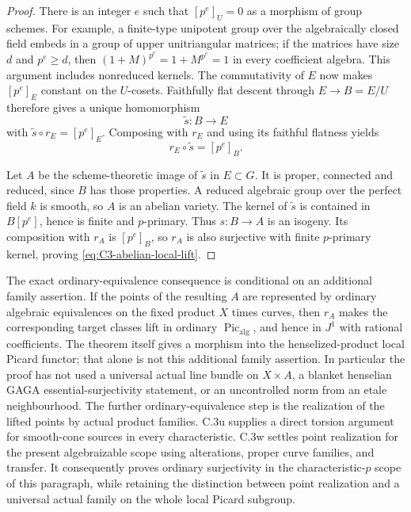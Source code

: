 \begin{proof}
There is an integer $e$ such that
$[p^e]_U=0$ as a morphism of group schemes.
For example, a finite-type unipotent group
over the algebraically closed field embeds
in a group of upper unitriangular matrices;
if the matrices have size $d$ and $p^e\ge d$,
then $(1+M)^{p^e}=1+M^{p^e}=1$ in every
coefficient algebra. This argument includes
nonreduced kernels. The commutativity of $E$
now makes $[p^e]_E$ constant on the $U$-cosets.
Faithfully flat descent through $E\to B=E/U$
therefore gives a unique homomorphism
\[
                         \widetilde s:B\longrightarrow E
\]
with $\widetilde s\circ r_E=[p^e]_E$.
Composing with $r_E$ and using its faithful
flatness yields
\[
                            r_E\circ\widetilde s=[p^e]_B.
\]

Let $A$ be the scheme-theoretic image of
$\widetilde s$ in $E\subset G$. It is
proper, connected and reduced, since $B$
has those properties. A reduced algebraic
group over the perfect field $k$ is smooth,
so $A$ is an abelian variety. The kernel
of $\widetilde s$ is contained in
$B[p^e]$, hence is finite and $p$-primary.
Thus $s:B\to A$ is an isogeny. Its
composition with $r_A$ is $[p^e]_B$, so
$r_A$ is also surjective with finite
$p$-primary kernel, proving
\eqref{eq:C3-abelian-local-lift}.
\end{proof}

The exact ordinary-equivalence consequence
is conditional on an additional family
assertion. If the points of the resulting
$A$ are represented by ordinary algebraic
equivalences on the fixed product $X$ times
curves, then $r_A$ makes the corresponding
target classes lift in ordinary
$\operatorname{Pic}_{\mathrm{alg}}$, and hence
in $J^1$ with rational coefficients.
The theorem itself gives a morphism into
the henselized-product local Picard functor;
that alone is not this additional family
assertion. In particular the proof has not
used a universal actual line bundle on
$X\times A$, a blanket henselian GAGA
essential-surjectivity statement, or an
uncontrolled norm from an etale neighbourhood.
The further ordinary-equivalence step is
the realization of the lifted points by
actual product families. C.3u supplies
a direct torsion argument for smooth-cone
sources in every characteristic. C.3w
settles point realization for the present
algebraizable scope using alterations,
proper curve families, and transfer.
It consequently proves ordinary
surjectivity in the characteristic-$p$
scope of this paragraph, while retaining
the distinction between point realization
and a universal actual family on the
whole local Picard subgroup.
